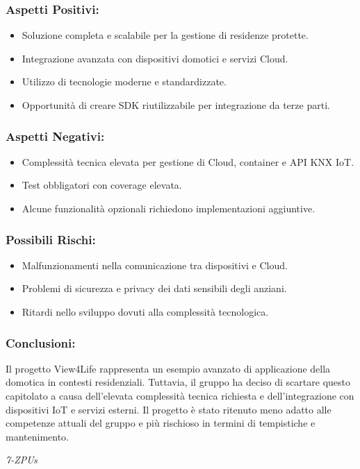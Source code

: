 \documentclass[a4paper,12pt]{article}
\begin{document}
\subsubsection*{Aspetti Positivi:}
\begin{itemize}
    \item Soluzione completa e scalabile per la gestione di residenze protette.
    \item Integrazione avanzata con dispositivi domotici e servizi Cloud.
    \item Utilizzo di tecnologie moderne e standardizzate.
    \item Opportunità di creare SDK riutilizzabile per integrazione da terze parti.
\end{itemize}

\subsubsection*{Aspetti Negativi:}
\begin{itemize}
    \item Complessità tecnica elevata per gestione di Cloud, container e API KNX IoT.
    \item Test obbligatori con coverage elevata.
    \item Alcune funzionalità opzionali richiedono implementazioni aggiuntive.
\end{itemize}

\subsubsection*{Possibili Rischi:}
\begin{itemize}
    \item Malfunzionamenti nella comunicazione tra dispositivi e Cloud.
    \item Problemi di sicurezza e privacy dei dati sensibili degli anziani.
    \item Ritardi nello sviluppo dovuti alla complessità tecnologica.
\end{itemize}

\subsubsection*{Conclusioni:}
Il progetto View4Life rappresenta un esempio avanzato di applicazione della domotica in contesti residenziali. Tuttavia, il gruppo ha deciso di scartare questo capitolato a causa dell’elevata complessità tecnica richiesta e dell’integrazione con dispositivi IoT e servizi esterni. Il progetto è stato ritenuto meno adatto alle competenze attuali del gruppo e più rischioso in termini di tempistiche e mantenimento.


\vspace{0.5cm}

\vfill
\begin{flushright}
    \textit{7-ZPUs}
\end{flushright}
\end{document}
